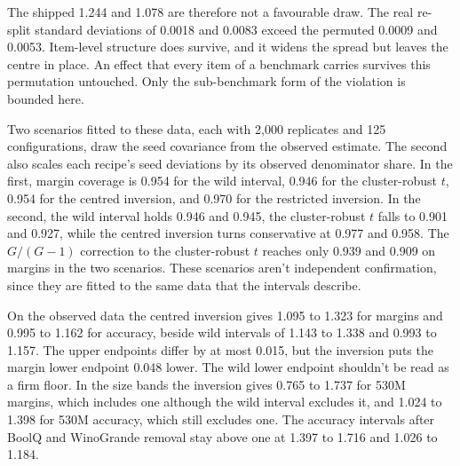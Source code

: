 The shipped 1.244 and 1.078 are therefore not a favourable draw. The real re-split standard deviations of 0.0018 and 0.0083 exceed the permuted 0.0009 and 0.0053. Item-level structure does survive, and it widens the spread but leaves the centre in place. An effect that every item of a benchmark carries survives this permutation untouched. Only the sub-benchmark form of the violation is bounded here.

Two scenarios fitted to these data, each with 2,000 replicates and 125 configurations, draw the seed covariance from the observed estimate. The second also scales each recipe's seed deviations by its observed denominator share. In the first, margin coverage is 0.954 for the wild interval, 0.946 for the cluster-robust $t$, 0.954 for the centred inversion, and 0.970 for the restricted inversion. In the second, the wild interval holds 0.946 and 0.945, the cluster-robust $t$ falls to 0.901 and 0.927, while the centred inversion turns conservative at 0.977 and 0.958. The $G/(G-1)$ correction to the cluster-robust $t$ reaches only 0.939 and 0.909 on margins in the two scenarios. These scenarios aren't independent confirmation, since they are fitted to the same data that the intervals describe.

On the observed data the centred inversion gives 1.095 to 1.323 for margins and 0.995 to 1.162 for accuracy, beside wild intervals of 1.143 to 1.338 and 0.993 to 1.157. The upper endpoints differ by at most 0.015, but the inversion puts the margin lower endpoint 0.048 lower. The wild lower endpoint shouldn't be read as a firm floor. In the size bands the inversion gives 0.765 to 1.737 for 530M margins, which includes one although the wild interval excludes it, and 1.024 to 1.398 for 530M accuracy, which still excludes one. The accuracy intervals after BoolQ and WinoGrande removal stay above one at 1.397 to 1.716 and 1.026 to 1.184.

